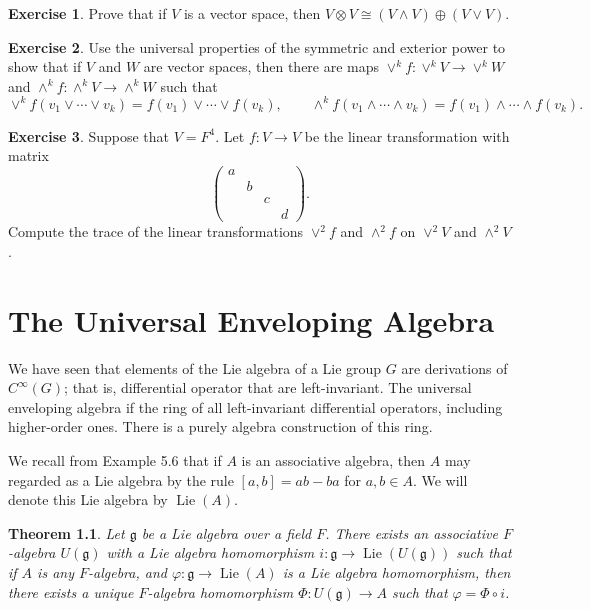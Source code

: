 \documentclass[12pt,reqno]{book}%
\newtheorem{theorem}{Theorem}[chapter]
\theoremstyle{definition}
\newtheorem{exercise}{Exercise}[chapter]
\theoremstyle{remark}
\theoremstyle{theorem}
\theoremstyle{remark}
\DeclareMathOperator{\Lie}{Lie}
\begin{document}
\begin{exercise}\label{}
    Prove that if $V$ is a vector space, then $V \otimes V \cong (V \wedge V) \oplus (V \vee V)$.
\end{exercise}

\begin{exercise}\label{}
    Use the universal properties of the symmetric and exterior power to show that if $V$ and $W$ are vector spaces, then there are maps $\vee^kf : \vee^kV \to \vee^kW$ and $\wedge^kf : \wedge^kV \to \wedge^kW$ such that
    \[
        \vee^kf(v_1 \vee \cdots \vee v_k) = f(v_1) \vee \cdots \vee f(v_k), \qquad \wedge^kf(v_1 \wedge \cdots \wedge v_k) = f(v_1) \wedge \cdots \wedge f(v_k).
    \]
\end{exercise}

\begin{exercise}\label{}
    Suppose that $V = F^4$.
    Let $f : V \to V$ be the linear transformation with matrix
    \[
        \begin{pmatrix}
            a & & & \\
            & b & & \\
            & & c & \\
            & & & d
        \end{pmatrix}.
    \]
    Compute the trace of the linear transformations $\vee^2f$ and $\wedge^2f$ on $\vee^2V$ and $\wedge^2V$.
\end{exercise}


\chapter{The Universal Enveloping Algebra}\label{}%
We have seen that elements of the Lie algebra of a Lie group $G$ are derivations of $C^\infty(G)$; that is, differential operator that are left-invariant.
The universal enveloping algebra if the ring of all left-invariant differential operators, including higher-order ones.
There is a purely algebra construction of this ring.

We recall from  Example 5.6 that if $A$ is an associative algebra, then $A$ may regarded as a Lie algebra by the rule $[a, b] = ab - ba$ for $a, b \in A$.
We will denote this Lie algebra by $\Lie(A)$.

\begin{theorem}\label{thm10.1}%
    Let $\mathfrak{g}$ be a Lie algebra over a field $F$.
    There exists an associative $F$-algebra $U(\mathfrak{g})$ with a Lie algebra homomorphism $i : \mathfrak{g} \to \Lie(U(\mathfrak{g}))$ such that if $A$ is any $F$-algebra, and $\varphi : \mathfrak{g} \to \Lie(A)$ is a Lie algebra homomorphism, then there exists a unique $F$-algebra homomorphism $\Phi : U(\mathfrak{g}) \to A$ such that $\varphi = \Phi \circ i$.
\end{theorem}%
\end{document}
